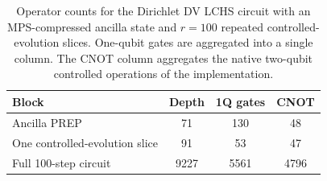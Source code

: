 \begin{table}[h]
\centering
{\small
\caption{Operator counts for the Dirichlet DV LCHS circuit with an MPS-compressed ancilla state and $r=100$ repeated controlled-evolution slices. One-qubit gates are aggregated into a single column. The CNOT column aggregates the native two-qubit controlled operations of the implementation.}
\label{tab:dv_circuit_compare}
\begin{tabular}{lccc}
\toprule
Block & Depth & 1Q gates & CNOT \\
\midrule
Ancilla PREP & 71 & 130 & 48 \\
One controlled-evolution slice & 91 & 53 & 47 \\
Full 100-step circuit & 9227 & 5561 & 4796 \\
\bottomrule
\end{tabular}}
\end{table}




